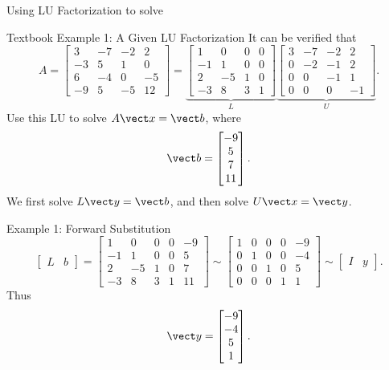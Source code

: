 \begin{frame}{Using LU Factorization to solve}
  
\end{frame}

\begin{frame}[shrink=8]{Textbook Example 1: A Given LU Factorization}
  It can be verified that
\[
A=\begin{bmatrix}
3&-7&-2&2\\
-3&5&1&0\\
6&-4&0&-5\\
-9&5&-5&12
\end{bmatrix}
=
\underbrace{\begin{bmatrix}
1&0&0&0\\
-1&1&0&0\\
2&-5&1&0\\
-3&8&3&1
\end{bmatrix}}_{L}
\underbrace{\begin{bmatrix}
3&-7&-2&2\\
0&-2&-1&2\\
0&0&-1&1\\
0&0&0&-1
\end{bmatrix}}_{U}.
\]
Use this LU to solve $A\vect x=\vect b$, where
\[
\vect b=\begin{bmatrix}-9\\5\\7\\11\end{bmatrix}.
\]
\pause
We first solve $L\vect y=\vect b$, and then solve $U\vect x=\vect y$.
\end{frame}

\begin{frame}{Example 1: Forward Substitution}
\small
\[
\begin{bmatrix}L&b\end{bmatrix}= \left[\begin{array}{rrrr|r}
1&0&0&0&-9\\
-1&1&0&0&5\\
2&-5&1&0&7\\
-3&8&3&1&11
\end{array}\right]
\sim
\left[\begin{array}{rrrr|r}
1&0&0&0&-9\\
0&1&0&0&-4\\
0&0&1&0&5\\
0&0&0&1&1
\end{array}\right]
\sim \begin{bmatrix}
  I&y
\end{bmatrix}.
\]
\pause
Thus
\[
\vect y=\begin{bmatrix}-9\\-4\\5\\1\end{bmatrix}.
\]
\end{frame}

